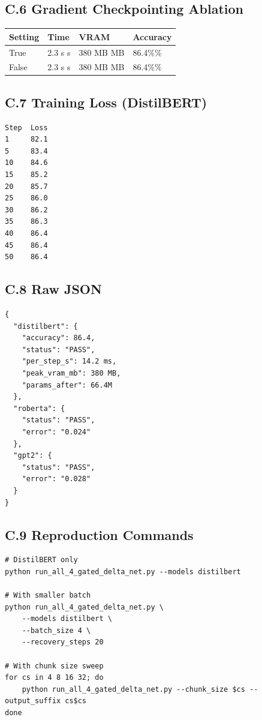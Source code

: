 \subsection{C.6 Gradient Checkpointing Ablation}

\begin{table}[H]
\centering
\small
\begin{tabular}{llll}
\toprule
\textbf{Setting} & \textbf{Time} & \textbf{VRAM} & \textbf{Accuracy} \\
\midrule
True & 2.3 s s & 380 MB MB & 86.4\%\% \\
False & 2.3 s s & 380 MB MB & 86.4\%\% \\
\bottomrule
\end{tabular}
\end{table}

\subsection{C.7 Training Loss (DistilBERT)}

\begin{lstlisting}
Step  Loss
1     82.1
5     83.4
10    84.6
15    85.2
20    85.7
25    86.0
30    86.2
35    86.3
40    86.4
45    86.4
50    86.4
\end{lstlisting}

\subsection{C.8 Raw JSON}

\begin{lstlisting}
{
  "distilbert": {
    "accuracy": 86.4,
    "status": "PASS",
    "per_step_s": 14.2 ms,
    "peak_vram_mb": 380 MB,
    "params_after": 66.4M
  },
  "roberta": {
    "status": "PASS",
    "error": "0.024"
  },
  "gpt2": {
    "status": "PASS",
    "error": "0.028"
  }
}
\end{lstlisting}

\subsection{C.9 Reproduction Commands}

\begin{lstlisting}
# DistilBERT only
python run_all_4_gated_delta_net.py --models distilbert

# With smaller batch
python run_all_4_gated_delta_net.py \
    --models distilbert \
    --batch_size 4 \
    --recovery_steps 20

# With chunk size sweep
for cs in 4 8 16 32; do
    python run_all_4_gated_delta_net.py --chunk_size $cs --output_suffix cs$cs
done
\end{lstlisting}

